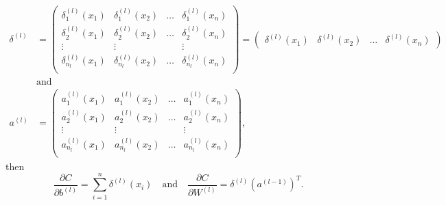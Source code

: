 \begin{align*}
    \delta^{(l)}&=\begin{pmatrix}\delta^{(l)}_1(x_1) & \delta^{(l)}_1(x_2) & \ldots & \delta^{(l)}_1(x_n)\\\delta^{(l)}_2(x_1) & \delta^{(l)}_2(x_2) & \ldots & \delta^{(l)}_2(x_n)\\\vdots & \vdots & & \vdots \\\delta^{(l)}_{n_l}(x_1) & \delta^{(l)}_{n_l}(x_2) & \ldots & \delta^{(l)}_{n_l}(x_n)\\\end{pmatrix} = \begin{pmatrix} \delta^{(l)}(x_1) & \delta^{(l)}(x_2) & \ldots & \delta^{(l)}(x_n) \end{pmatrix}
    \\
    &\text{and}
    \\
    a^{(l)}&=\begin{pmatrix}a^{(l)}_1(x_1) & a^{(l)}_1(x_2) & \ldots & a^{(l)}_1(x_n)\\a^{(l)}_2(x_1) & a^{(l)}_2(x_2) & \ldots & a^{(l)}_2(x_n)\\\vdots & \vdots & & \vdots \\a^{(l)}_{n_l}(x_1) & a^{(l)}_{n_l}(x_2) & \ldots & a^{(l)}_{n_l}(x_n)\\\end{pmatrix},
\end{align*}
then
\begin{equation*}
    \frac{\partial C}{\partial b^{(l)}} = \sum_{i=1}^n\delta^{(l)}(x_i) 
    \quad\text{and}\quad
    \frac{\partial C}{\partial W^{(l)}} = \delta^{(l)}(a^{(l-1)})^T.
\end{equation*}
